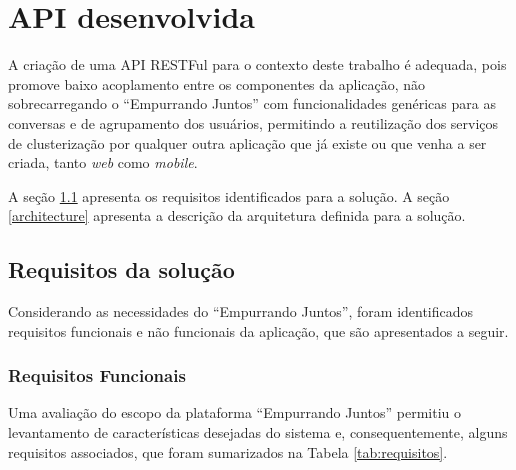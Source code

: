 \chapter{API desenvolvida} \label{cap:proposta}

  A criação de uma API RESTFul para o contexto deste trabalho é adequada, pois promove baixo acoplamento
  entre os componentes da aplicação, não sobrecarregando o ``Empurrando Juntos'' com funcionalidades genéricas
  para as conversas e de agrupamento dos usuários,
  permitindo a reutilização dos serviços de clusterização por qualquer
  outra aplicação que já existe ou que venha a ser criada, tanto \textit{web} como \textit{mobile}.
  
  A seção \ref{requirements} apresenta os requisitos identificados para a solução.
  A seção \ref{architecture} apresenta a descrição da arquitetura definida para a solução.

\section{Requisitos da solução} \label{requirements}

    Considerando as necessidades do ``Empurrando Juntos'',
    foram identificados requisitos funcionais e não funcionais da aplicação,
    que são apresentados a seguir.

    \subsection*{Requisitos Funcionais} \label{functional_requirements}

    Uma avaliação do escopo da plataforma ``Empurrando Juntos'' permitiu o levantamento de características desejadas do sistema e,
    consequentemente, alguns requisitos associados, que foram sumarizados na Tabela \ref{tab:requisitos}.

